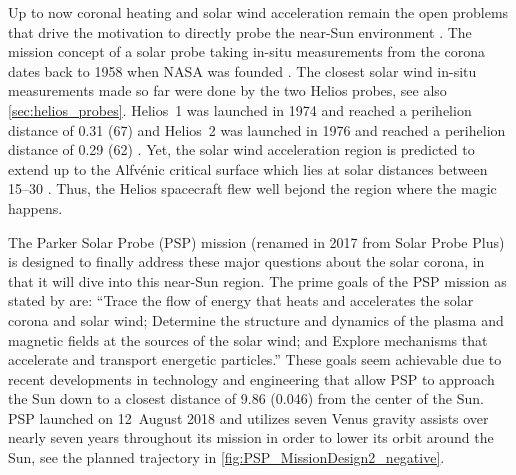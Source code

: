 Up to now coronal heating and solar wind acceleration remain the open problems that drive the motivation to directly probe the near-Sun environment \citep{McComas2007,Fox2015}. The mission concept of a solar probe taking in-situ measurements from the corona dates back to 1958 when NASA was founded \citep{McComas200807}. The closest solar wind in-situ measurements made so far were done by the two Helios probes, see also \autoref{sec:helios_probes}. Helios~1 was launched in 1974 and reached a perihelion distance of \SI{0.31}{\au} (\SI{67}{\Rs}) and Helios~2 was launched in 1976 and reached a perihelion distance of \SI{0.29}{\au} (\SI{62}{\Rs}) \citep{Rosenbauer1977}. Yet, the solar wind acceleration region is predicted to extend up to the Alfvénic critical surface which lies at solar distances between \SIrange{15}{30}{\Rs} \citep{Katsikas2010,Goelzer2014}. Thus, the Helios spacecraft flew well bejond the region where the magic happens.

The Parker Solar Probe (PSP) mission (renamed in 2017 from Solar Probe Plus) is designed to finally address these major questions about the solar corona, in that it will dive into this near-Sun region. The prime goals of the PSP mission as stated by \citet{Fox2015} are: ``Trace the flow of energy that heats and accelerates the solar corona and solar wind; Determine the structure and dynamics of the plasma and magnetic fields at the sources of the solar wind; and Explore mechanisms that accelerate and transport energetic particles.''
These goals seem achievable due to recent developments in technology and engineering that allow PSP to approach the Sun down to a closest distance of \SI{9.86}{\Rs} (\SI{0.046}{\au}) from the center of the Sun. PSP launched on 12~August 2018 and utilizes seven Venus gravity assists over nearly seven years throughout its mission in order to lower its orbit around the Sun, see the planned trajectory in \autoref{fig:PSP_MissionDesign2_negative}.
\begin{figure}
\end{figure}

